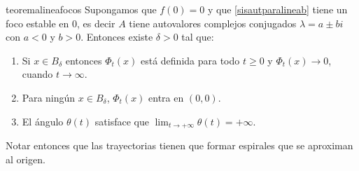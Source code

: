 \begin{teorema}[Focos]{teoremalineafocos} Supongamos que $f(0)=0$ y que
\eqref{sisautparalineab} tiene un foco estable en $0$, es decir
$A$ tiene autovalores complejos conjugados $\lambda=a\pm bi$ con
$a<0$ y $b>0$. Entonces existe $\delta>0$ tal que:

\begin{enumerate}
       \item\label{inc1c}  Si       $x\in B_{\delta}$ entonces $\Phi_t(x)$ está definida para todo $t\geq 0$
       y  $\Phi_t(x)\to 0$, cuando $t\to\infty$.

        \item\label{inc2c} Para ningún $x\in B_{\delta}$,  $\Phi_t(x)$ entra en $(0,0)$.
        \item\label{inc3c} El ángulo $\theta(t)$ satisface que
        $\lim_{t\to+\infty}\theta(t)=+\infty$.
\end{enumerate}
Notar entonces que las trayectorias tienen que formar espirales
que se aproximan al origen.
\end{teorema}

